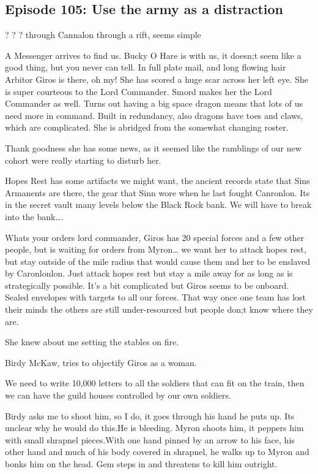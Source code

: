 \subsection{Episode 105: Use the army as a distraction}

? ? ? through Cannalon through a rift, seems simple\medskip

A Messenger arrives to find us. Bucky O Hare is with us, it doesn;t seem like a good thing, but you never can tell. In full plate mail, and long flowing hair Arbitor Giros is there, oh my! She has scored a huge scar across her left eye. She is super courteous to the Lord Commander. Smord makes her the Lord Commander as well. Turns out having a big space dragon means that lots of us need more in command. Built in redundancy, also dragons have toes and claws, which are complicated. She is abridged from the somewhat changing roster.\medskip

Thank goodness she has some news, as it seemed like the ramblings of our new cohort were really starting to disturb her.\medskip

Hopes Rest has some artifacts we might want, the ancient records state that Sins Armanents are there, the gear that Sinn wore when he last fought Canronlon. Its in the secret vault many levels below the Black Rock bank. We will have to break into the bank….\medskip

Whats your orders lord commander, Giros has 20 special forces and a few other people, but is waiting for orders from Myron… we want her to attack hopes rest, but stay outside of the mile radius that would cause them and her to be enslaved by Caronlonlon. Just attack hopes rest but stay a mile away for as long as is strategically possible. It's a bit complicated but Giros seems to be onboard. Sealed envelopes with targets to all our forces. That way once one team has lost their minds the others are still under-resourced but people don;t know where they are.\medskip

She knew about me setting the stables on fire.\medskip

Birdy McKaw, tries to objectify Giros as a woman.\medskip

We need to write 10,000 letters to all the soldiers that can fit on the train, then we can have the guild houses controlled by our own soldiers.\medskip

Birdy asks me to shoot him, so I do, it goes through his hand he puts up. Its unclear why he would do this.He is bleeding. Myron shoots him, it peppers him with small shrapnel pieces.With one hand pinned by an arrow to his face, his other hand and much of his body covered in shrapnel, he walks up to Myron and bonks him on the head. Gem steps in and threatens to kill him outright.\medskip

